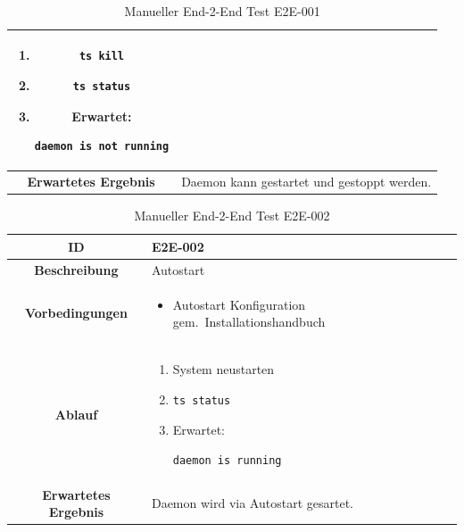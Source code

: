 \documentclass[a4paper,12pt]{report}
\begin{document}
\begin{table}[h!]
\begin{tabular}{|c|p{10cm}|}
\begin{enumerate}
\begin{verbatim}
                \end{verbatim}
                \item \begin{verbatim}ts kill
                \end{verbatim}
                \item \begin{verbatim}ts status
                \end{verbatim}
                \item Erwartet: \begin{verbatim}daemon is not running
                \end{verbatim}
            \end{enumerate} \\ \hline
            \textbf{Erwartetes Ergebnis} & Daemon kann gestartet und gestoppt werden. \\ \hline
        \end{tabular}
        \caption{Manueller End-2-End Test E2E-001}\label{tab:e2e-1}
    \end{table}

    \begin{table}[h!]
        \centering
        \setlength{\leftmargini}{0.8cm}
        \begin{tabular}{|c|p{10cm}|}
            \hline
            \textbf{ID}                  & E2E-002                             \\ \hline
            \textbf{Beschreibung}        & Autostart                           \\ \hline
            \textbf{Vorbedingungen} &
            \begin{itemize}
                \item Autostart Konfiguration gem.\ Installationshandbuch
            \end{itemize} \\ \hline
            \textbf{Ablauf} &
            \begin{enumerate}
                \item System neustarten
                \item \begin{verbatim}ts status
                \end{verbatim}
                \item Erwartet: \begin{verbatim}daemon is running
                \end{verbatim}
            \end{enumerate} \\ \hline
            \textbf{Erwartetes Ergebnis} & Daemon wird via Autostart gesartet. \\ \hline
        \end{tabular}
        \caption{Manueller End-2-End Test E2E-002}\label{tab:e2e-2}
    \end{table}
\end{document}
